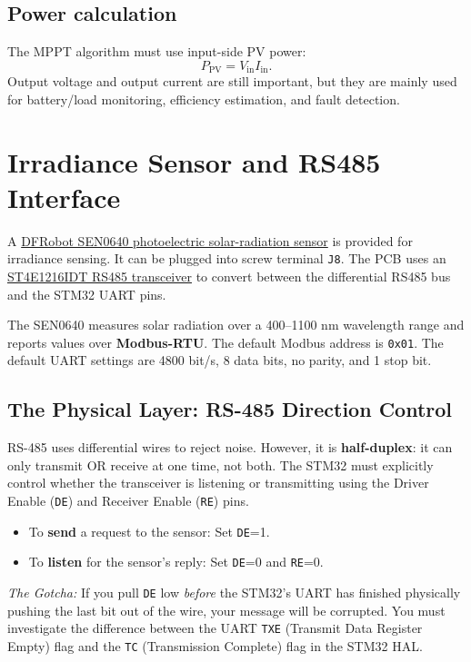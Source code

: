 \documentclass[11pt,a4paper]{article}
\newcommand{\code}[1]{\texttt{#1}}
\newcommand{\Pin}{P_{\mathrm{PV}}}
\let\originalsection\section
\renewcommand{\section}{\clearpage\originalsection}
\begin{document}
\subsection{Power calculation}

The MPPT algorithm must use input-side PV power:
\begin{equation}
  \Pin = V_{\mathrm{in}} I_{\mathrm{in}}.
\end{equation}
Output voltage and output current are still important, but they are mainly used for battery/load monitoring, efficiency estimation, and fault detection. 


\section{Irradiance Sensor and RS485 Interface}

A \href{https://wiki.dfrobot.com/sen0640/docs/20430}{DFRobot SEN0640 photoelectric solar-radiation sensor} is provided for irradiance sensing. It can be plugged into screw terminal \code{J8}. The PCB uses an \href{https://www.st.com/resource/en/datasheet/st4e1216.pdf}{ST4E1216IDT RS485 transceiver} to convert between the differential RS485 bus and the STM32 UART pins.

The SEN0640 measures solar radiation over a 400--1100 nm wavelength range and reports values over \textbf{Modbus-RTU}. The default Modbus address is \code{0x01}. The default UART settings are 4800 bit/s, 8 data bits, no parity, and 1 stop bit.

\subsection{The Physical Layer: RS-485 Direction Control}

RS-485 uses differential wires to reject noise. However, it is \textbf{half-duplex}: it can only transmit OR receive at one time, not both. The STM32 must explicitly control whether the transceiver is listening or transmitting using the Driver Enable (\code{DE}) and Receiver Enable (\code{RE}) pins.
\begin{itemize}
  \item To \textbf{send} a request to the sensor: Set \code{DE}=1.
  \item To \textbf{listen} for the sensor's reply: Set \code{DE}=0 and \code{RE}=0.
\end{itemize}

\textit{The Gotcha:} If you pull \code{DE} low \textit{before} the STM32's UART has finished physically pushing the last bit out of the wire, your message will be corrupted. You must investigate the difference between the UART \code{TXE} (Transmit Data Register Empty) flag and the \code{TC} (Transmission Complete) flag in the STM32 HAL.
\end{document}
